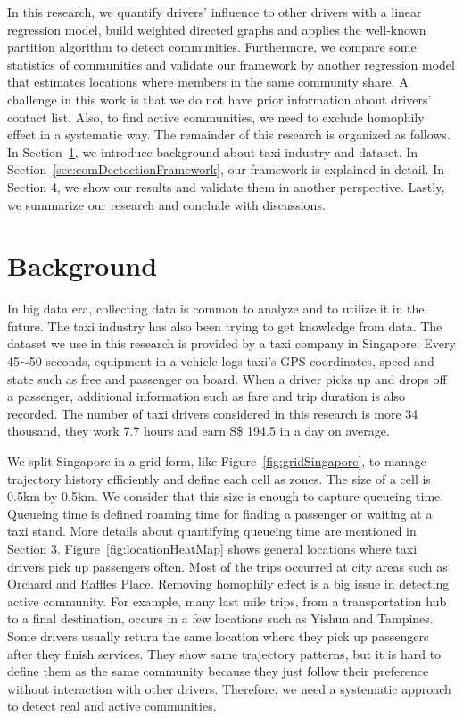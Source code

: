 \documentclass{article}
\begin{document}
In this research, we quantify drivers' influence to other drivers with a linear regression model, build weighted directed graphs and applies the well-known partition algorithm to detect communities. Furthermore, we compare some statistics of communities and validate our framework by another regression model that estimates locations where members in the same community share. A challenge in this work is that we do not have prior information about drivers' contact list. Also, to find active communities, we need to exclude homophily effect in a systematic way. The remainder of this research is organized as follows. In Section~\ref{sec:background}, we introduce background about taxi industry and dataset. In Section~\ref{sec:comDectectionFramework}, our framework is explained in detail. In Section 4, we show our results and validate them in another perspective. Lastly, we summarize our research and conclude with discussions.


\section{Background} \label{sec:background}

In big data era, collecting data is common to analyze and to utilize it in the future. The taxi industry has also been trying to get knowledge from data. The dataset we use in this research is provided by a taxi company in Singapore. Every 45$\sim$50 seconds, equipment in a vehicle logs taxi's GPS coordinates, speed and state such as free and passenger on board. When a driver picks up and drops off a passenger, additional information such as fare and trip duration is also recorded. The number of taxi drivers considered in this research is more 34 thousand, they work 7.7 hours and earn S\$ 194.5 in a day on average.

We split Singapore in a grid form, like Figure~\ref{fig:gridSingapore}, to manage trajectory history efficiently and define each cell as zones. The size of a cell is 0.5km by 0.5km. We consider that this size is enough to capture queueing time. Queueing time is defined roaming time for finding a passenger or waiting at a taxi stand. More details about quantifying queueing time are mentioned in Section 3. Figure~\ref{fig:locationHeatMap} shows general locations where taxi drivers pick up passengers often. Most of the trips occurred at city areas such as Orchard and Raffles Place. Removing homophily effect is a big issue in detecting active community. For example, many last mile trips, from a transportation hub to a final destination, occurs in a few locations such as Yishun and Tampines. Some drivers usually return the same location where they pick up passengers after they finish services. They show same trajectory patterns, but it is hard to define them as the same community because they just follow their preference without interaction with other drivers. Therefore, we need a systematic approach to detect real and active communities.
\end{document}
